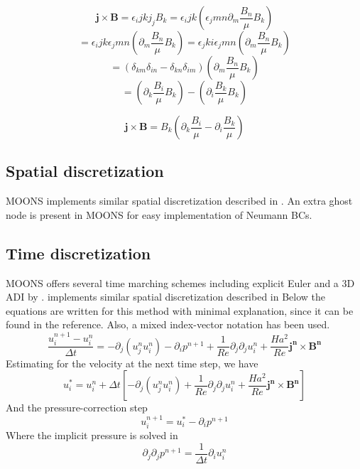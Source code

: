 \documentclass[11pt]{article}
\begin{document}
\begin{equation}
\pmb{j}\times \pmb{B} = \epsilon_ijk j_j B_k = 
\epsilon_ijk \left( \epsilon_jmn \partial_m \frac{B_n}{\mu} B_k \right)
\end{equation}
\begin{equation}
= \epsilon_ijk \epsilon_jmn \left( \partial_m \frac{B_n}{\mu} B_k \right)
= \epsilon_jki \epsilon_jmn \left( \partial_m \frac{B_n}{\mu} B_k \right)
\end{equation}
\begin{equation}
= (\delta_{km} \delta_{in} - \delta_{kn} \delta_{im} ) \left( \partial_m \frac{B_n}{\mu} B_k \right)
\end{equation}
\begin{equation}
= \left( \partial_k \frac{B_i}{\mu} B_k \right) - 
\left( \partial_i \frac{B_k}{\mu} B_k \right)
\end{equation}

\begin{equation}
\pmb{j} \times \pmb{B} = B_k 
\left( \partial_k \frac{B_i}{\mu} - \partial_i \frac{B_k}{\mu} \right)
\end{equation}

\subsection{Spatial discretization}
MOONS implements similar spatial discretization described in \cite{griebel1997numerical}. An extra ghost node is present in MOONS for easy implementation of Neumann BCs.

\subsection{Time discretization}
MOONS offers several time marching schemes including explicit Euler and a 3D ADI by . implements similar spatial discretization described in \cite{griebel1997numerical}
Below the equations are written for this method with minimal explanation, since it can be found in the reference. Also, a mixed index-vector notation has been used.
\begin{equation}
\frac{u_i^{n+1}- u_i^{n}}{\Delta t} = - \partial_j (u_j^{n} u_i^{n}) 
-\partial_i  p^{n+1} + 
\frac{1}{Re} \partial_j \partial_j u_i^{n} + 
\frac{Ha^2}{Re} \pmb{j^{n}} \times \pmb{B^{n}}
\end{equation}
Estimating for the velocity at the next time step, we have
\begin{equation}
u_i^* = u_i^{n} + \Delta t \left[ - \partial_j (u_j^{n} u_i^{n}) + 
\frac{1}{Re} \partial_j \partial_j u_i^{n} + 
\frac{Ha^2}{Re} \pmb{j^{n}} \times \pmb{B^{n}} \right]
\end{equation}
And the pressure-correction step
\begin{equation}
u_i^{n+1} = u_i^* -\partial_i p^{n+1}
\end{equation}
Where the implicit pressure is solved in
\begin{equation}
\partial_j \partial_j p^{n+1} = \frac{1}{\Delta t} \partial_i u_i^n
\end{equation}




\end{document}
